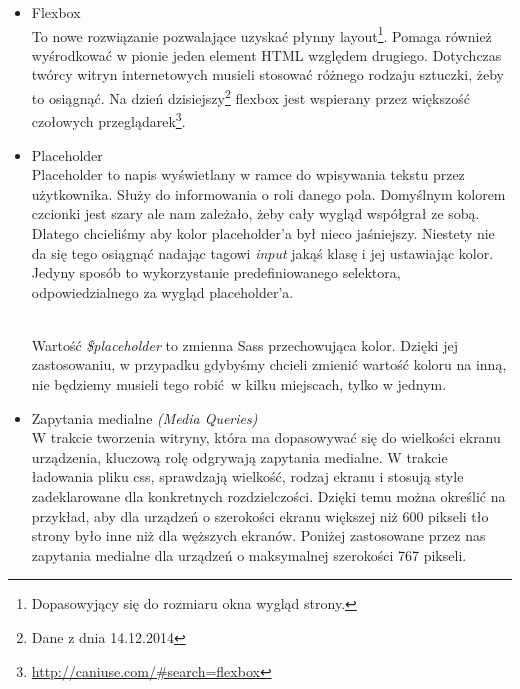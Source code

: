         \begin{itemize}
          \item Flexbox\\
            To nowe rozwiązanie pozwalające uzyskać płynny layout\footnote{Dopasowyjący się do rozmiaru okna wygląd strony.}. Pomaga również wyśrodkować w pionie jeden element HTML względem drugiego. Dotychczas twórcy witryn internetowych musieli stosować różnego rodzaju sztuczki, żeby to osiągnąć. Na dzień dzisiejszy\footnote{Dane z dnia 14.12.2014} flexbox jest wspierany przez większość czołowych przeglądarek\footnote{\url{http://caniuse.com/\#search=flexbox}}. \\
            

          \item Placeholder\\
            Placeholder to napis wyświetlany w ramce do wpisywania tekstu przez użytkownika. Służy do informowania o roli danego pola. Domyślnym kolorem czcionki jest szary ale nam zależało, żeby cały wygląd współgrał ze sobą. Dlatego chcieliśmy aby kolor placeholder'a był nieco jaśniejszy. Niestety nie da się tego osiągnąć nadając tagowi \emph{input} jakąś klasę i jej ustawiając kolor. Jedyny sposób to wykorzystanie predefiniowanego selektora, odpowiedzialnego za wygląd placeholder'a.

            \begin{code}
              
            \end{code}\\

            Wartość \emph{\$placeholder} to zmienna Sass przechowująca kolor. Dzięki jej zastosowaniu, w przypadku gdybyśmy chcieli zmienić wartość koloru na inną, nie będziemy musieli tego robić w kilku miejscach, tylko w jednym.

          \item Zapytania medialne \emph{(Media Queries)}\\ 
            W trakcie tworzenia witryny, która ma dopasowywać się do wielkości ekranu urządzenia, kluczową rolę odgrywają zapytania medialne. W trakcie ładowania pliku css, sprawdzają wielkość, rodzaj ekranu i stosują style zadeklarowane dla konkretnych rozdzielczości. Dzięki temu można określić na przykład, aby dla urządzeń o szerokości ekranu większej niż 600 pikseli tło strony było inne niż dla węższych ekranów.
            Poniżej zastosowane przez nas zapytania medialne dla urządzeń o maksymalnej szerokości 767 pikseli.
            \begin{code}
              
            \end{code}
        \end{itemize}
